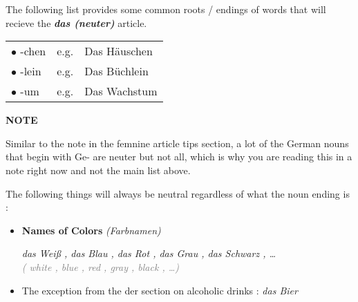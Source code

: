 \documentclass[a4paper,twocolumn,10pt]{article}
\newcommand{\newpar}
{\par \vspace{0.3cm}}
\begin{document}
The following list provides some common roots / endings of words that will
recieve the \textbf{\textit{das (neuter)}} article.


\nolinenumbers

\vspace{0.2cm}

\begin{tabularx}{\linewidth}{l r l}

\rowcolor{white} $\bullet$ -chen & e.g. & Das Häuschen \\
\rowcolor{white} $\bullet$ -lein & e.g. & Das Büchlein \\
\rowcolor{white} $\bullet$ -um & e.g. & Das Wachstum \\

\end{tabularx}

\vspace{0.2cm}

\linenumbers



\nolinenumbers
\vspace{0.2cm}
\centering
\begin{note-bg}

	\begin{note-theword}
		{\footnotesize \textbf{NOTE} }
	\end{note-theword}

	\begin{note-content} \justifying Similar to the note in the femnine article
		tips section, a lot of the German nouns that begin with Ge- are neuter
		but not all, which is why you are reading this in a note right now and
		not the main list above.

	\end{note-content}

\end{note-bg}
\linenumbers
\justifying


The following things will always be neutral regardless of what the noun ending
is :


\begin{itemize}[noitemsep]

	\item \textbf{Names of Colors} \textit{ (Farbnamen) }


\noindent
\textit{das Weiß , das Blau , das Rot , das Grau , das Schwarz , \ldots}\\
\textcolor{gray} { \textit{( white , blue , red , gray , black , \ldots )} } \newpar


	\item The exception from the der section on alcoholic drinks : \textit{das
			Bier}

\end{itemize}
\end{document}
